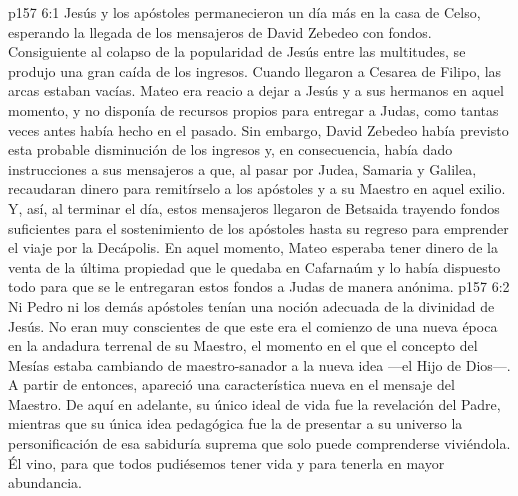 \vs p157 6:1 Jesús y los apóstoles permanecieron un día más en la casa de Celso, esperando la llegada de los mensajeros de David Zebedeo con fondos. Consiguiente al colapso de la popularidad de Jesús entre las multitudes, se produjo una gran caída de los ingresos. Cuando llegaron a Cesarea de Filipo, las arcas estaban vacías. Mateo era reacio a dejar a Jesús y a sus hermanos en aquel momento, y no disponía de recursos propios para entregar a Judas, como tantas veces antes había hecho en el pasado. Sin embargo, David Zebedeo había previsto esta probable disminución de los ingresos y, en consecuencia, había dado instrucciones a sus mensajeros a que, al pasar por Judea, Samaria y Galilea, recaudaran dinero para remitírselo a los apóstoles y a su Maestro en aquel exilio. Y, así, al terminar el día, estos mensajeros llegaron de Betsaida trayendo fondos suficientes para el sostenimiento de los apóstoles hasta su regreso para emprender el viaje por la Decápolis. En aquel momento, Mateo esperaba tener dinero de la venta de la última propiedad que le quedaba en Cafarnaúm y lo había dispuesto todo para que se le entregaran estos fondos a Judas de manera anónima.
\vs p157 6:2 \pc Ni Pedro ni los demás apóstoles tenían una noción adecuada de la divinidad de Jesús. No eran muy conscientes de que este era el comienzo de una nueva época en la andadura terrenal de su Maestro, el momento en el que el concepto del Mesías estaba cambiando de maestro\hyp{}sanador a la nueva idea ---el Hijo de Dios---. A partir de entonces, apareció una característica nueva en el mensaje del Maestro. De aquí en adelante, su único ideal de vida fue la revelación del Padre, mientras que su única idea pedagógica fue la de presentar a su universo la personificación de esa sabiduría suprema que solo puede comprenderse viviéndola. Él vino, para que todos pudiésemos tener vida y para tenerla en mayor abundancia.

